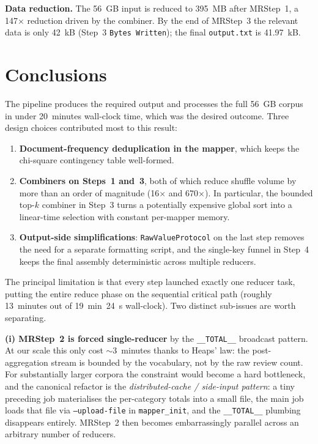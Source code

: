 \documentclass[11pt,a4paper]{article}
\begin{document}
\textbf{Data reduction.}  The 56~GB input is reduced to 395~MB after
MRStep~1, a 147$\times$ reduction driven by the combiner. By the end of
MRStep~3 the relevant data is only 42~kB (Step~3 \texttt{Bytes Written});
the final \texttt{output.txt} is 41.97~kB.

\section{Conclusions}
\label{sec:conclusions}

The pipeline produces the required output and processes the full 56~GB
corpus in under 20~minutes wall-clock time, which was the desired outcome. Three design choices
contributed most to this result:

\begin{enumerate}[leftmargin=*,nosep]
\item \textbf{Document-frequency deduplication in the mapper}, which
      keeps the chi-square contingency table well-formed.
\item \textbf{Combiners on Steps~1 and~3}, both of which reduce shuffle
      volume by more than an order of magnitude (16$\times$ and 670$\times$).
      In particular, the bounded top-$k$ combiner in Step~3 turns
      a potentially expensive global sort into a linear-time selection
      with constant per-mapper memory.
\item \textbf{Output-side simplifications}: \texttt{RawValueProtocol} on
      the last step removes the need for a separate formatting script,
      and the single-key funnel in Step~4 keeps the final assembly
      deterministic across multiple reducers.
\end{enumerate}

The principal limitation is that every step launched exactly one reducer
task, putting the entire reduce phase on the sequential critical path
(roughly 13~minutes out of 19~min~24~s wall-clock). Two distinct
sub-issues are worth separating.

\textbf{(i) MRStep~2 is forced single-reducer} by the
\texttt{\_\_TOTAL\_\_} broadcast pattern. At our scale this only cost
$\sim$3~minutes thanks to Heaps' law: the post-aggregation stream is
bounded by the vocabulary, not by the raw review count.  For
substantially larger corpora the constraint would become a hard
bottleneck, and the canonical refactor is the \emph{distributed-cache /
side-input pattern}: a tiny preceding job materialises the per-category
totals into a small file, the main job loads that file via
\texttt{--upload-file} in \texttt{mapper\_init}, and the
\texttt{\_\_TOTAL\_\_} plumbing disappears entirely. MRStep~2 then
becomes embarrassingly parallel across an arbitrary number of reducers.
\end{document}

